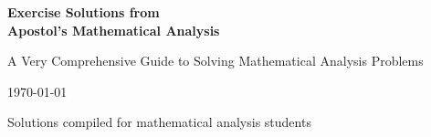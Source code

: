 \documentclass[openany]{book}
\begin{document}
\begin{titlepage}
    \centering
    \vspace*{2cm}
    
    
    \vspace{2cm}
    
    {\Huge\bfseries Exercise Solutions from\\[0.5cm] Apostol's Mathematical Analysis}
    
    \vspace{1cm}
    
    {\Large A Very Comprehensive Guide to Solving Mathematical Analysis Problems}
    
    \vspace{2cm}
    
    {\large \today}
    
    \vfill
    
    {\large Solutions compiled for mathematical analysis students}
    
    \vspace{1cm}
\end{titlepage}

\tableofcontents

















\end{document}
